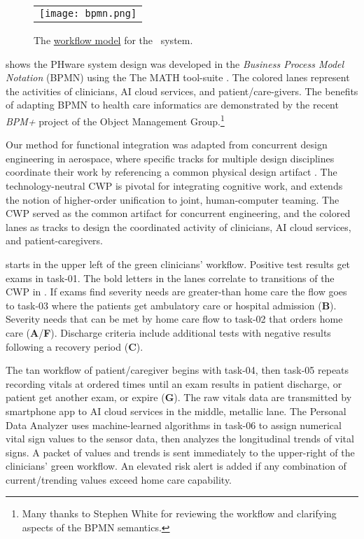 \begin{figure*}
  \begin{center}
    \begin{tabular}{c}
      \texttt{[image: bpmn.png]}
    \end{tabular}
  \end{center}
\caption{The \href{https://github.com/ericmercer/SPIN-bpmn-cwp-verification-paper/blob/main/16-Feb-2022-BPMN-resources.png}{workflow model} for the \phware\ system.}
\label{fig:bpmn}
\end{figure*}

 shows the PHware system design was developed in the \emph{Business Process Model Notation} (BPMN) \cite{BPMN} \cite{BPMNSpecification} using the The MATH tool-suite \cite{workflowmodel}.
The colored lanes represent the activities of clinicians, AI cloud services, and patient/care-givers.
The benefits of adapting BPMN to health care informatics are demonstrated by the recent \emph{BPM+} project of the Object Management Group.\footnote{Many thanks to Stephen White for reviewing the workflow and clarifying aspects of the BPMN semantics.}

Our method for functional integration was adapted from concurrent design engineering in aerospace, where specific tracks for multiple design disciplines coordinate their work by referencing a common physical design artifact \cite{10.1007/978-1-4471-1538-0_9}.
The technology-neutral CWP is pivotal for integrating cognitive work, and extends the notion of higher-order unification \cite{10.1007/3-540-45685-6_2} to joint, human-computer teaming. The CWP served as the common artifact for concurrent engineering, and the colored lanes as tracks to design the coordinated activity of clinicians, AI cloud services, and patient-caregivers. %

 starts in the upper left of the green clinicians' workflow.
Positive test results get exams in task-01. The bold letters in the lanes correlate to transitions of the CWP in .
If exams find severity needs are greater-than home care the flow goes to task-03 where the patients get ambulatory care or hospital admission (\textbf{B}).
Severity needs that can be met by home care flow to task-02 that orders home care (\textbf{A}/\textbf{F}).
Discharge criteria include additional tests with negative results following a recovery period (\textbf{C}).

The tan workflow of patient/caregiver begins with task-04, then task-05 repeats recording vitals at ordered times until an exam results in patient discharge, or patient get another exam, or expire (\textbf{G}). 
The raw vitals data are transmitted by smartphone app to AI cloud services in the middle, metallic lane. The Personal Data Analyzer uses machine-learned algorithms in task-06 to assign numerical vital sign values to the sensor data, then analyzes the longitudinal trends of vital signs.
A packet of values and trends is sent immediately to the upper-right of the clinicians' green workflow. An elevated risk alert is added if any combination of current/trending values exceed home care capability.

